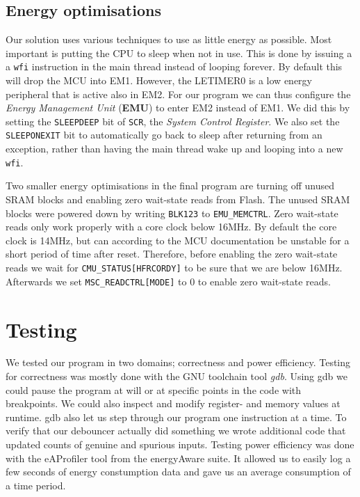 \subsection{Energy optimisations}

Our solution uses various techniques to use as little energy as possible. Most
important is putting the CPU to sleep when not in use. This is done by issuing a
a {\tt wfi} instruction in the main thread instead of looping forever. By
default this will drop the MCU into EM1. However, the LETIMER0 is a low energy
peripheral that is active also in EM2. For our program we can thus configure the
\emph{Energy Management Unit} (\textbf{EMU}) to enter EM2 instead of EM1. We did
this by setting the {\tt SLEEPDEEP} bit of {\tt SCR}, the \emph{System Control
Register}. We also set the {\tt SLEEPONEXIT} bit to automatically go back to
sleep after returning from an exception, rather than having the main thread wake
up and looping into a new {\tt wfi}.

Two smaller energy optimisations in the final program are turning off unused
SRAM blocks and enabling zero wait-state reads from Flash. The unused SRAM
blocks were powered down by writing {\tt BLK123} to {\tt EMU\_MEMCTRL}. Zero
wait-state reads only work properly with a core clock below 16MHz. By default
the core clock is 14MHz, but can according to the MCU documentation be unstable
for a short period of time after reset. Therefore, before enabling the zero
wait-state reads we wait for {\tt CMU\_STATUS[HFRCORDY]} to be sure that we are
below 16MHz. Afterwards we set {\tt MSC\_READCTRL[MODE]} to 0 to enable zero
wait-state reads.

\section{Testing}

We tested our program in two domains; correctness and power efficiency. Testing
for correctness was mostly done with the GNU toolchain tool \emph{gdb}. Using
gdb we could pause the program at will or at specific points in the code with
breakpoints. We could also inspect and modify register- and memory values at
runtime. gdb also let us step through our program one instruction at a time. To
verify that our debouncer actually did something we wrote additional code that
updated counts of genuine and spurious inputs. Testing power efficiency was done
with the eAProfiler tool from the energyAware suite. It allowed us to easily log
a few seconds of energy constumption data and gave us an average consumption of
a time period.
